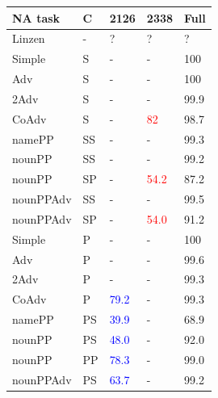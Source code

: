 \begin{center}
\begin{table}[ht]
\centering
\begin{tabular}{|P{2.3cm}|P{0.4cm}||P{0.6cm}|P{0.6cm}|P{0.6cm}|}
\hline
\B NA task & \B C & \B \unit{2}{\textbf{126}} & \B \unit{2}{\textbf{338}} & \B Full \\
\hline
\B Linzen & \B - &  ? &  ? &  ? \\
\hline


Simple & S & - &  - &  100 \\

Adv & S & - &  - &  100 \\

2Adv & S & - &  - &  99.9 \\

CoAdv & S & - &  \textcolor{red}{82} &  98.7 \\

namePP & SS & - &  - &  99.3 \\

nounPP & SS & - &  - &  99.2 \\

nounPP & SP &  - &  \textcolor{red}{54.2} &  87.2 \\

nounPPAdv & SS &  - &  - & 99.5 \\

nounPPAdv & SP &  - &  \textcolor{red}{54.0} & 91.2 \\


\hline
Simple & P &  - &  - &  100 \\

Adv & P &  - &  - &  99.6 \\

2Adv & P & - &  - &  99.3 \\

CoAdv & P &  \textcolor{blue}{79.2} &  - &  99.3 \\

namePP & PS & \textcolor{blue}{39.9} &  - &  68.9 \\

nounPP & PS &  \textcolor{blue}{48.0} & - &  92.0 \\

nounPP & PP &  \textcolor{blue}{78.3} & - &  99.0 \\

nounPPAdv & PS & \textcolor{blue}{63.7} &  - &  99.2 \\


\end{tabular}
\end{table}
\end{center}
